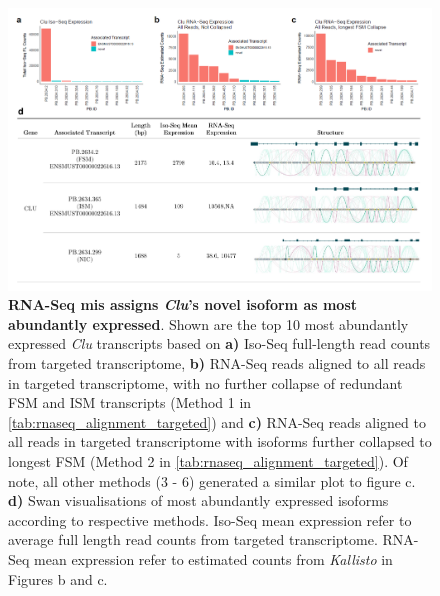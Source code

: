 \begin{landscape}
	\begin{figure}[htp]
		\centering
		\includegraphics[page=1,trim={0cm 1cm 0cm 0cm},clip,scale = 0.8]{Figures/ProjectDevelopment_Figures_Landscape.pdf}
		\captionsetup{width=1.2\textwidth,singlelinecheck=off}
		\caption[RNA-Seq mis assignment of dominant isoform associated with \textit{Clu}]%
		{\textbf{RNA-Seq mis assigns \textit{Clu}'s novel isoform as most abundantly expressed}. Shown are the top 10 most abundantly expressed \textit{Clu} transcripts based on \textbf{a)} Iso-Seq full-length read counts from targeted transcriptome, \textbf{b)} RNA-Seq reads aligned to all reads in targeted transcriptome, with no further collapse of redundant FSM and ISM transcripts (Method 1 in \cref{tab:rnaseq_alignment_targeted}) and \textbf{c)} RNA-Seq reads aligned to all reads in targeted transcriptome with isoforms further collapsed to longest FSM (Method 2 in \cref{tab:rnaseq_alignment_targeted}). Of note, all other methods (3 - 6) generated a similar plot to figure c. \textbf{d)} Swan visualisations of most abundantly expressed isoforms according to respective methods. Iso-Seq mean expression refer to average full length read counts from targeted transcriptome. RNA-Seq mean expression refer to estimated counts from \textit{Kallisto} in Figures b and c. 
		}
		\label{fig:Clu_TargetedRNAseqAlignment}
	\end{figure}
	

\end{landscape}
